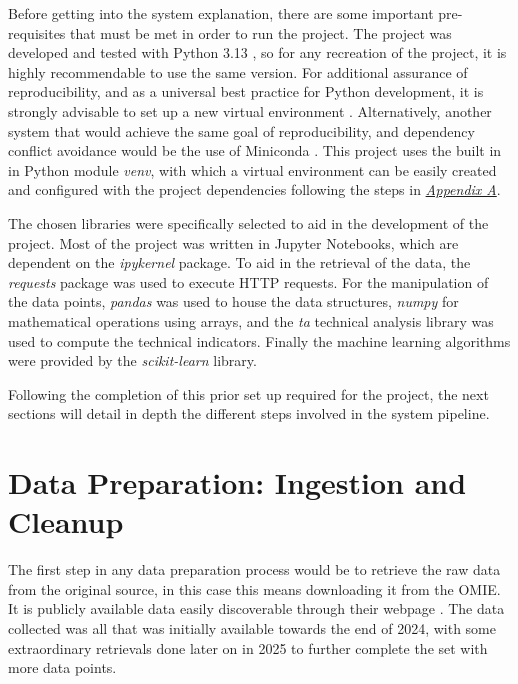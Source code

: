 \documentclass[12pt]{report} %
\begin{document}
Before getting into the system explanation, there are some important pre-requisites that must be met in order to run the project. The project was developed and tested with Python 3.13 \cite{python3.13}, so for any recreation of the project, it is highly recommendable to use the same version. For additional assurance of reproducibility, and as a universal best practice for Python development, it is strongly advisable to set up a new virtual environment \cite{python_venv}. Alternatively, another system that would achieve the same goal of reproducibility, and dependency conflict avoidance would be the use of Miniconda \cite{conda}. This project uses the built in in Python module \textit{venv}, with which a virtual environment can be easily created and configured with the project dependencies following the steps in \textit{\hyperref[app:appendix_a_env_setup]{Appendix A}}.

The chosen libraries were specifically selected to aid in the development of the project. Most of the project was written in Jupyter Notebooks, which are dependent on the \textit{ipykernel} package. To aid in the retrieval of the data, the \textit{requests} package was used to execute HTTP requests. For the manipulation of the data points, \textit{pandas} was used to house the data structures, \textit{numpy} for mathematical operations using arrays, and the \textit{ta} technical analysis library was used to compute the technical indicators. Finally the machine learning algorithms were provided by the \textit{scikit-learn} library.

Following the completion of this prior set up required for the project, the next sections will detail in depth the different steps involved in the system pipeline.



\section{Data Preparation: Ingestion and Cleanup}


The first step in any data preparation process would be to retrieve the raw data from the original source, in this case this means downloading it from the OMIE. It is publicly available data easily discoverable through their webpage \cite{omie_datos}. The data collected was all that was initially available towards the end of 2024, with some extraordinary retrievals done later on in 2025 to further complete the set with more data points.
\end{document}
